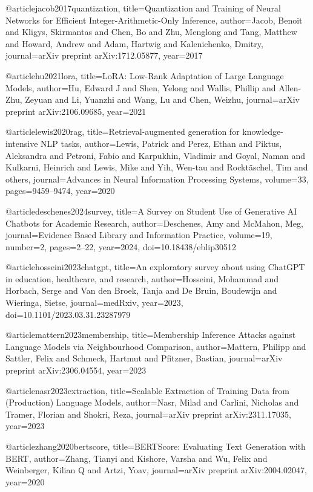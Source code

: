 @article{jacob2017quantization,
  title={Quantization and Training of Neural Networks for Efficient Integer-Arithmetic-Only Inference},
  author={Jacob, Benoit and Kligys, Skirmantas and Chen, Bo and Zhu, Menglong and Tang, Matthew and Howard, Andrew and Adam, Hartwig and Kalenichenko, Dmitry},
  journal={arXiv preprint arXiv:1712.05877},
  year={2017}
}

@article{hu2021lora,
  title={LoRA: Low-Rank Adaptation of Large Language Models},
  author={Hu, Edward J and Shen, Yelong and Wallis, Phillip and Allen-Zhu, Zeyuan and Li, Yuanzhi and Wang, Lu and Chen, Weizhu},
  journal={arXiv preprint arXiv:2106.09685},
  year={2021}
}

@article{lewis2020rag,
  title={Retrieval-augmented generation for knowledge-intensive NLP tasks},
  author={Lewis, Patrick and Perez, Ethan and Piktus, Aleksandra and Petroni, Fabio and Karpukhin, Vladimir and Goyal, Naman and Kulkarni, Heinrich and Lewis, Mike and Yih, Wen-tau and Rockt{\"a}schel, Tim and others},
  journal={Advances in Neural Information Processing Systems},
  volume={33},
  pages={9459--9474},
  year={2020}
}

@article{deschenes2024survey,
  title={A Survey on Student Use of Generative AI Chatbots for Academic Research},
  author={Deschenes, Amy and McMahon, Meg},
  journal={Evidence Based Library and Information Practice},
  volume={19},
  number={2},
  pages={2--22},
  year={2024},
  doi={10.18438/eblip30512}
}

@article{hosseini2023chatgpt,
  title={An exploratory survey about using ChatGPT in education, healthcare, and research},
  author={Hosseini, Mohammad and Horbach, Serge and Van den Broek, Tanja and De Bruin, Boudewijn and Wieringa, Sietse},
  journal={medRxiv},
  year={2023},
  doi={10.1101/2023.03.31.23287979}
}

@article{mattern2023membership,
  title={Membership Inference Attacks against Language Models via Neighbourhood Comparison},
  author={Mattern, Philipp and Sattler, Felix and Schmeck, Hartmut and Pfitzner, Bastian},
  journal={arXiv preprint arXiv:2306.04554},
  year={2023}
}

@article{nasr2023extraction,
  title={Scalable Extraction of Training Data from (Production) Language Models},
  author={Nasr, Milad and Carlini, Nicholas and Tramer, Florian and Shokri, Reza},
  journal={arXiv preprint arXiv:2311.17035},
  year={2023}
}

@article{zhang2020bertscore,
  title={BERTScore: Evaluating Text Generation with BERT},
  author={Zhang, Tianyi and Kishore, Varsha and Wu, Felix and Weinberger, Kilian Q and Artzi, Yoav},
  journal={arXiv preprint arXiv:2004.02047},
  year={2020}
}

